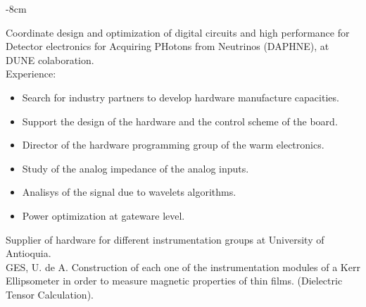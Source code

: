 \documentclass[10pt,a4paper]{altacv}
\begin{document}
  \tagline{  }

\begin{adjustwidth}{}{-8cm}
\makecvheader
\end{adjustwidth}


Coordinate design and optimization of digital circuits and high performance for Detector electronics for Acquiring PHotons from Neutrinos (DAPHNE), at DUNE colaboration.\\
Experience:
\begin{itemize}
\item Search for industry partners to develop hardware manufacture capacities.
\item Support the design of the hardware and the control scheme of the board.
\item Director of the hardware programming group of the warm electronics.
\item Study of the analog impedance of the analog inputs.
\item Analisys of the signal due to wavelets algorithms.
\item Power optimization at gateware level.
\end{itemize}
\divider
{} {}
Supplier of hardware for different instrumentation groups at University of Antioquia.\\
\divider
{} {GES, U. de A.}
Construction of each one of the instrumentation modules of a Kerr Ellipsometer in order to measure magnetic properties of thin films. (Dielectric Tensor Calculation).\\
\end{document}
